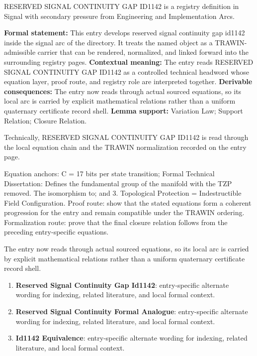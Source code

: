 
\begingroup\small
{}
RESERVED SIGNAL CONTINUITY GAP ID1142 is a registry definition in Signal with secondary pressure from Engineering and Implementation Arcs.

\begingroup\footnotesize\setlength{\emergencystretch}{3em}\sloppy
\textbf{Formal statement:} This entry develops reserved signal continuity gap id1142 inside the signal arc of the directory. It treats the named object as a TRAWIN-admissible carrier that can be rendered, normalized, and linked forward into the surrounding registry pages. \textbf{Contextual meaning:} The entry reads RESERVED SIGNAL CONTINUITY GAP ID1142 as a controlled technical headword whose equation layer, proof route, and registry role are interpreted together. \textbf{Derivable consequences:} The entry now reads through actual sourced equations, so its local arc is carried by explicit mathematical relations rather than a uniform quaternary certificate record shell. \textbf{Lemma support:} Variation Law; Support Relation; Closure Relation.\par
\endgroup

Technically, RESERVED SIGNAL CONTINUITY GAP ID1142 is read through the local equation chain and the TRAWIN normalization recorded on the entry page.

Equation anchors: C = 17 bits per state transition; Formal Technical Dissertation: Defines the fundamental group of the manifold with the TZP removed. The isomorphism to; and 3. Topological Protection = Indestructible Field Configuration. Proof route: show that the stated equations form a coherent progression for the entry and remain compatible under the TRAWIN ordering. Formalization route: prove that the final closure relation follows from the preceding entry-specific equations.

The entry now reads through actual sourced equations, so its local arc is carried by explicit mathematical relations rather than a uniform quaternary certificate record shell.
\endgroup

\begin{enumerate}[leftmargin=1.6em,itemsep=6pt,topsep=4pt]
\item \textbf{Reserved Signal Continuity Gap Id1142}: entry-specific alternate wording for indexing, related literature, and local formal context.
\item \textbf{Reserved Signal Continuity Formal Analogue}: entry-specific alternate wording for indexing, related literature, and local formal context.
\item \textbf{Id1142 Equivalence}: entry-specific alternate wording for indexing, related literature, and local formal context.
\end{enumerate}

